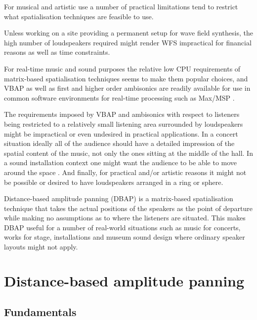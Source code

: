\documentclass[twoside,10pt]{article}
\begin{document}
For musical and artistic use a number of practical limitations tend to restrict what spatialisation techniques are feasible to use.

Unless working on a site providing a permanent setup for wave field synthesis, the high number of loudspeakers required might render WFS impractical for financial reasons as well as time constraints.

For real-time music and sound purposes the relative low CPU requirements of matrix-based spatialisation techniques seems to make them popular choices, and VBAP as well as first and higher order ambisonics are readily available for use in common software environments for real-time processing such as Max/MSP \cite{Pulkki:2000vbap_max, Schacher:2006ambi_max, Neukom:2008ambipan}.

The requirements imposed by VBAP and ambisonics with respect to listeners being restricted to a relatively small listening area surrounded by loudspeakers might be impractical or even undesired in practical applications. In a concert situation ideally all of the audience should have a detailed impression of the spatial content of the music, not only the ones sitting at the middle of the hall. In a sound installation context one might want the audience to be able to move around the space \cite{lossius:2008installations}. And finally, for practical and/or artistic reasons it might not be possible or desired to have loudspeakers arranged in a ring or sphere.

Distance-based amplitude panning (DBAP) is a matrix-based spatialisation technique that takes the actual positions of the speakers as the point of departure while making no assumptions as to where the listeners are situated. This makes DBAP useful for a number of real-world situations such as music for concerts, works for stage, installations and museum sound design where ordinary speaker layouts might not apply.


%
%

\section{Distance-based amplitude panning}

\subsection{Fundamentals}
\end{document}

